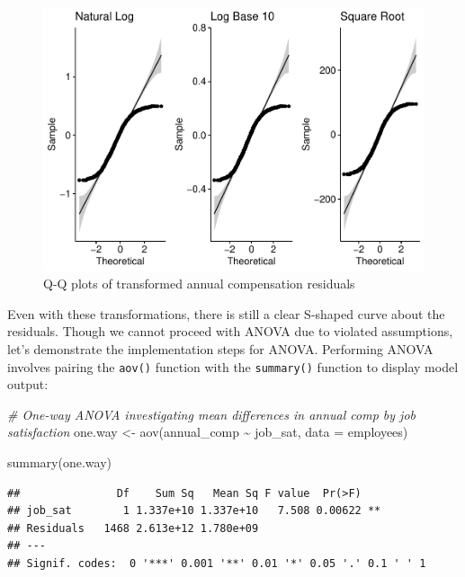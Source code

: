 \documentclass[
]{book}
\newenvironment{Shaded}{\begin{snugshade}}{\end{snugshade}}
\newcommand{\AttributeTok}[1]{\textcolor[rgb]{0.77,0.63,0.00}{#1}}
\newcommand{\CommentTok}[1]{\textcolor[rgb]{0.56,0.35,0.01}{\textit{#1}}}
\newcommand{\FunctionTok}[1]{\textcolor[rgb]{0.00,0.00,0.00}{#1}}
\newcommand{\NormalTok}[1]{#1}
\newcommand{\OtherTok}[1]{\textcolor[rgb]{0.56,0.35,0.01}{#1}}
\newcommand{\SpecialCharTok}[1]{\textcolor[rgb]{0.00,0.00,0.00}{#1}}
\begin{document}
\begin{figure}

{\centering \includegraphics{The_Fundamentals_of_People_Analytics_files/figure-latex/qq-plots-trans-1} 

}

\caption{Q-Q plots of transformed annual compensation residuals}\label{fig:qq-plots-trans}
\end{figure}

Even with these transformations, there is still a clear S-shaped curve about the residuals. Though we cannot proceed with ANOVA due to violated assumptions, let's demonstrate the implementation steps for ANOVA. Performing ANOVA involves pairing the \texttt{aov()} function with the \texttt{summary()} function to display model output:

\begin{Shaded}
\begin{Highlighting}[]
\CommentTok{\# One{-}way ANOVA investigating mean differences in annual comp by job satisfaction}
\NormalTok{one.way }\OtherTok{\textless{}{-}} \FunctionTok{aov}\NormalTok{(annual\_comp }\SpecialCharTok{\textasciitilde{}}\NormalTok{ job\_sat, }\AttributeTok{data =}\NormalTok{ employees)}

\FunctionTok{summary}\NormalTok{(one.way)}
\end{Highlighting}
\end{Shaded}

\begin{verbatim}
##               Df    Sum Sq   Mean Sq F value  Pr(>F)   
## job_sat        1 1.337e+10 1.337e+10   7.508 0.00622 **
## Residuals   1468 2.613e+12 1.780e+09                   
## ---
## Signif. codes:  0 '***' 0.001 '**' 0.01 '*' 0.05 '.' 0.1 ' ' 1
\end{verbatim}
\end{document}

